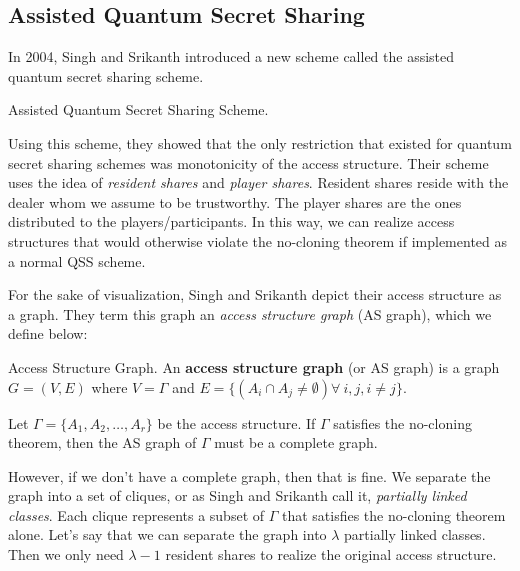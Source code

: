 \subsection{Assisted Quantum Secret Sharing}

In 2004, Singh and Srikanth introduced a new scheme called the assisted quantum secret sharing scheme. 

\begin{definition}{Assisted Quantum Secret Sharing Scheme.}
    
\end{definition}

Using this scheme, they showed that the only restriction that existed for quantum secret sharing schemes was monotonicity of the access structure. Their scheme uses the idea of \textit{resident shares} and \textit{player shares}. Resident shares reside with the dealer whom we assume to be trustworthy. The player shares are the ones distributed to the players/participants. In this way, we can realize access structures that would otherwise violate the no-cloning theorem if implemented as a normal QSS scheme. 

For the sake of visualization, Singh and Srikanth depict their access structure as a graph. They term this graph an \textit{access structure graph} (AS graph), which we define below:

\begin{definition}{Access Structure Graph.}
    \label{defn:access-structure-graph}
    An \textbf{access structure graph} (or AS graph) is a graph $G = (V,E)$ where $V = \Gamma$ and $E = \{(A_i \cap A_j \neq \emptyset) \forall\:i,j,i\neq j\}$.
\end{definition}

\begin{theorem}
    \label{thm:complete-as-graph}
    Let $\Gamma = \{A_1,A_2,\dots,A_r\}$ be the access structure. If $\Gamma$ satisfies the no-cloning theorem, then the AS graph of $\Gamma$ must be a complete graph.
\end{theorem}

However, if we don't have a complete graph, then that is fine. We separate the graph into a set of cliques, or as Singh and Srikanth call it, \textit{partially linked classes}. Each clique represents a subset of $\Gamma$ that satisfies the no-cloning theorem alone. Let's say that we can separate the graph into $\lambda$ partially linked classes. Then we only need $\lambda - 1$ resident shares to realize the original access structure.

